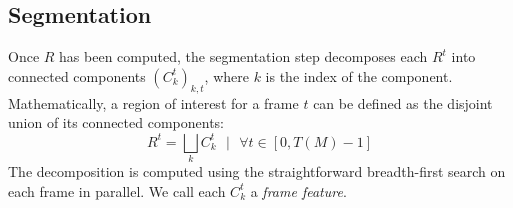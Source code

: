 \subsection{Segmentation}\label{sec:features:segmentation}
Once $R$ has been computed, the segmentation step decomposes each $R^t$ into connected components $(C_k^t)_{k,t}$, where $k$ is the index of the component. Mathematically, a region of interest for a frame $t$ can be defined as the disjoint union of its connected components:
\begin{equation}
 R^t = \bigsqcup_k C_k^t \text{~~} \vert \text{~~} \forall t \in [0, T(M)-1]
\end{equation}
The decomposition is computed using the straightforward breadth-first search on each frame in parallel. 
We call each $C_{k}^{t}$ a \emph{frame feature}.

